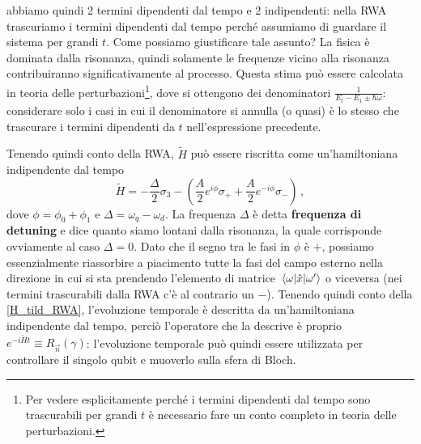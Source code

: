 abbiamo quindi 2 termini dipendenti dal tempo e 2 indipendenti: nella RWA trascuriamo i termini dipendenti dal tempo perché assumiamo di guardare il sistema per grandi $t$. Come possiamo giustificare tale assunto? La fisica è dominata dalla risonanza, quindi solamente le frequenze vicino alla risonanza contribuiranno significativamente al processo. Questa stima può essere calcolata in teoria delle perturbazioni\footnote{Per vedere esplicitamente perché i termini dipendenti dal tempo sono trascurabili per grandi $t$ è necessario fare un conto completo in teoria delle perturbazioni.}, dove si ottengono dei denominatori $\frac{1}{E_t - E_1 \pm \hbar \omega}$: considerare solo i casi in cui il denominatore si annulla (o quasi) è lo stesso che trascurare i termini dipendenti da $t$ nell'espressione precedente. 

\noindent Tenendo quindi conto della RWA, $\tilde{H}$ può essere riscritta come un'hamiltoniana indipendente dal tempo 
\begin{equation}\label{H_tild_RWA}
    \tilde{H} = - \frac{\Delta}{2} \sigma_3 - \left( \frac{A}{2} e^{i \phi} \sigma_+ + \frac{A}{2} e^{-i \phi} \sigma_- \right) \, ,
\end{equation}
dove $\phi = \phi_0 +\phi_1$ e $\Delta = \omega_q - \omega_d$. La frequenza $\Delta$ è detta \textbf{frequenza di detuning} e dice quanto siamo lontani dalla risonanza, la quale corrisponde ovviamente al caso $\Delta = 0$. Dato che il segno tra le fasi in $\phi$ è $+$, possiamo essenzialmente riassorbire a piacimento tutte la fasi del campo esterno nella direzione in cui si sta prendendo l'elemento di matrice $\mel{\omega}{\hat{x}}{\omega'}$ o viceversa (nei termini trascurabili dalla RWA c'è al contrario un $-$). Tenendo quindi conto della \eqref{H_tild_RWA}, l'evoluzione temporale è descritta da un'hamiltoniana indipendente dal tempo, perciò l'operatore che la descrive è proprio $e^{-i \tilde{H} t} \equiv R_{\vec{n}}(\gamma)$: l'evoluzione temporale può quindi essere utilizzata per controllare il singolo qubit e muoverlo sulla sfera di Bloch.